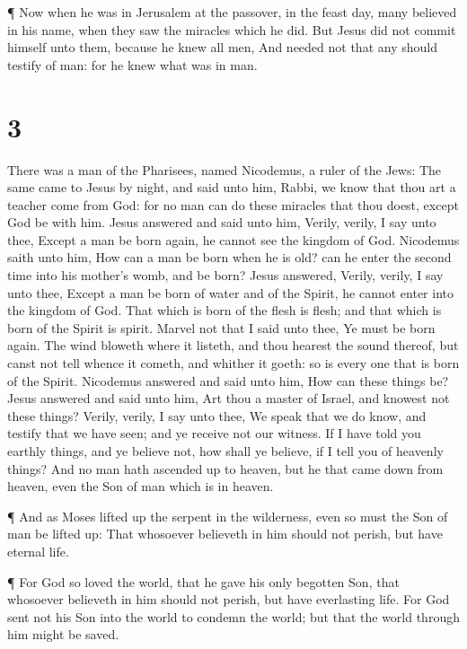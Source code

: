  ¶ Now when he was in Jerusalem at the passover, in the
feast day, many believed in his name, when they saw the miracles which
he did.  But Jesus did not commit himself unto them,
because he knew all men,  And needed not that any should
testify of man: for he knew what was in man.

\hypertarget{section-2}{%
\section{3}\label{section-2}}

 There was a man of the Pharisees, named Nicodemus, a ruler
of the Jews:  The same came to Jesus by night, and said unto
him, Rabbi, we know that thou art a teacher come from God: for no man
can do these miracles that thou doest, except God be with him.
 Jesus answered and said unto him, Verily, verily, I say
unto thee, Except a man be born again, he cannot see the kingdom of God.
 Nicodemus saith unto him, How can a man be born when he is
old? can he enter the second time into his mother's womb, and be born?
 Jesus answered, Verily, verily, I say unto thee, Except a
man be born of water and of the Spirit, he cannot enter into the kingdom
of God.  That which is born of the flesh is flesh; and that
which is born of the Spirit is spirit.  Marvel not that I
said unto thee, Ye must be born again.  The wind bloweth
where it listeth, and thou hearest the sound thereof, but canst not tell
whence it cometh, and whither it goeth: so is every one that is born of
the Spirit.  Nicodemus answered and said unto him, How can
these things be?  Jesus answered and said unto him, Art
thou a master of Israel, and knowest not these things? 
Verily, verily, I say unto thee, We speak that we do know, and testify
that we have seen; and ye receive not our witness.  If I
have told you earthly things, and ye believe not, how shall ye believe,
if I tell you of heavenly things?  And no man hath ascended
up to heaven, but he that came down from heaven, even the Son of man
which is in heaven.

 ¶ And as Moses lifted up the serpent in the wilderness,
even so must the Son of man be lifted up:  That whosoever
believeth in him should not perish, but have eternal life.

 ¶ For God so loved the world, that he gave his only
begotten Son, that whosoever believeth in him should not perish, but
have everlasting life.  For God sent not his Son into the
world to condemn the world; but that the world through him might be
saved.


